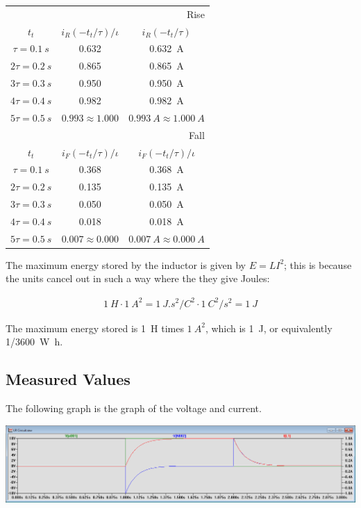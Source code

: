\documentclass{article}
\begin{document}
\begin{tabular}{c | c | c}
    \multicolumn{3}{r}{Rise}\\
    \(t_t\)   & \(  i_R(-t_t/\tau)/\iota \) & \( i_R(-t_t/\tau) \) \\ \hline
    \(\tau = \SI{0.1}{s}\)  & \num{0.632} & \SI{0.632}{A}\\ \hline
    \(2\tau = \SI{0.2}{s}\) & \num{0.865} & \SI{0.865}{A}\\ \hline
    \(3\tau = \SI{0.3}{s}\) & \num{0.950} & \SI{0.950}{A}\\ \hline
    \(4\tau = \SI{0.4}{s}\) & \num{0.982} & \SI{0.982}{A}\\ \hline
    \(5\tau = \SI{0.5}{s}\) & \(0.993 \approx 1.000\) & \(\SI{0.993}{A} \approx \SI{1.000}{A}\)\\ \hline
    \multicolumn{3}{r}{Fall} \\
    \(t_t\)   & \( i_F(-t_t/\tau)/\iota \) & \(i_F(-t_t/\tau)/\iota\) \\ \hline
    \(\tau = \SI{0.1}{s}\)  & \num{0.368} & \SI{0.368}{A}\\ \hline
    \(2\tau = \SI{0.2}{s}\) & \num{0.135} & \SI{0.135}{A}\\ \hline
    \(3\tau = \SI{0.3}{s}\) & \num{0.050} & \SI{0.050}{A}\\ \hline
    \(4\tau = \SI{0.4}{s}\) & \num{0.018} & \SI{0.018}{A}\\ \hline
    \(5\tau = \SI{0.5}{s}\) & \(0.007 \approx 0.000\) & \(\SI{0.007}{A} \approx \SI{0.000}{A}\)
\end{tabular}

The maximum energy stored by the inductor is given by
\(E = LI^2\); this is because the units cancel out in such
a way where the they give Joules:

\begin{align*}
    \SI{1}{H} \cdot \SI{1}{A}^2
    = \SI{1}{J.s^2/C^2} \cdot \SI{1}{C^2/s^2} = \SI{1}{J}
\end{align*}

The maximum energy stored is \SI{1}{H} times \(\SI{1}{A}^2\),
which is \SI{1}{J}, or equivalently \SI{1/3600}{W.h}.

\subsection{Measured Values} The following graph is the graph of
the voltage and current.

\includegraphics[width=\textwidth]{Images/Circuit.png}
\end{document}
